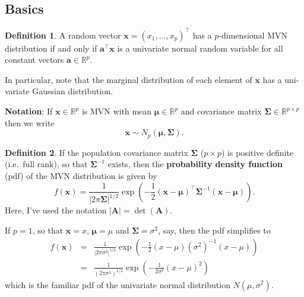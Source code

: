 \documentclass[
]{book}
\theoremstyle{definition}
\newtheorem{definition}{Definition}[chapter]
\theoremstyle{definition}
\theoremstyle{definition}
\theoremstyle{definition}
\theoremstyle{remark}
\begin{document}
\hypertarget{basics}{%
\subsection{Basics}\label{basics}}

\begin{definition}
\protect\hypertarget{def:mvn}{}{\label{def:mvn} }A random vector \(\mathbf x=(x_1, \ldots , x_p)^\top\) has a \(p\)-dimensional MVN distribution if and only if \(\mathbf a^\top \mathbf x\) is a univariate normal random variable for all constant vectors \(\mathbf a\in \mathbb{R}^p\).
\end{definition}

In particular, note that the marginal distribution of each element of \(\mathbf x\) has a uni-variate Gaussian distribution.

\textbf{Notation}: \quad If \(\mathbf x\in \mathbb{R}^p\) is MVN with mean \({\boldsymbol{\mu}}\in \mathbb{R}^p\) and covariance matrix \(\boldsymbol{\Sigma}\in \mathbb{R}^{p\times p}\) then we write
\[ \mathbf x\sim N_p ({\boldsymbol{\mu}}, \boldsymbol{\Sigma}).\]

\begin{definition}
\protect\hypertarget{def:mvnpdf}{}{\label{def:mvnpdf} }If the population covariance matrix \(\boldsymbol{\Sigma}\) (\(p \times p\)) is positive definite (i.e.~full rank), so that \(\boldsymbol{\Sigma}^{-1}\) exists,
then the \textbf{probability density function} (pdf) of the MVN distribution is given by
\[ f(\mathbf x) = \frac{1}{| 2 \pi \boldsymbol{\Sigma}|^{1/2}} \exp \left(-\frac{1}{2}(\mathbf x- {\boldsymbol{\mu}})^\top \boldsymbol{\Sigma}^{-1} (\mathbf x- {\boldsymbol{\mu}}) \right).\]
Here, I've used the notation \(|\mathbf A| = \det(\mathbf A)\).\\
\end{definition}

If \(p=1\), so that \(\mathbf x= x\), \({\boldsymbol{\mu}}= \mu\) and \(\boldsymbol{\Sigma}= \sigma^2\), say, then the pdf simplifies to
\begin{eqnarray*}
f(\mathbf x) &=& \frac{1}{|2 \pi \sigma^2|^{1/2}} \exp \left(-\frac{1}{2}(x - \mu) (\sigma^2)^{-1} (x - \mu) \right)\\
&=& \frac{1}{(2 \pi \sigma^2)^{1/2}} \exp \left(-\frac{1}{2 \sigma^2}(x - \mu)^2 \right)
\end{eqnarray*}
which is the familiar pdf of the univariate normal distribution \(N(\mu,\sigma^2)\).
\end{document}
